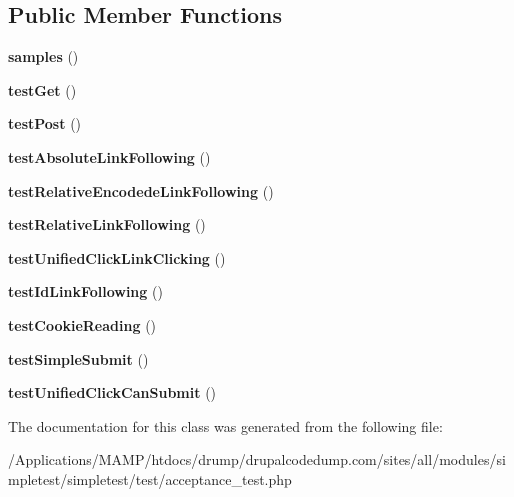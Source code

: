 \subsection*{Public Member Functions}
\begin{DoxyCompactItemize}
\item 
\hypertarget{class_test_of_live_browser_a60930689b5b51f4587618c2006ceb881}{
{\bfseries samples} ()}
\label{class_test_of_live_browser_a60930689b5b51f4587618c2006ceb881}

\item 
\hypertarget{class_test_of_live_browser_a64c9f3e86bc8e36ee02c8564f030dd6a}{
{\bfseries testGet} ()}
\label{class_test_of_live_browser_a64c9f3e86bc8e36ee02c8564f030dd6a}

\item 
\hypertarget{class_test_of_live_browser_a950159db364644160ed605a9cd57b612}{
{\bfseries testPost} ()}
\label{class_test_of_live_browser_a950159db364644160ed605a9cd57b612}

\item 
\hypertarget{class_test_of_live_browser_a673123e9d8c302a536be2061071640f1}{
{\bfseries testAbsoluteLinkFollowing} ()}
\label{class_test_of_live_browser_a673123e9d8c302a536be2061071640f1}

\item 
\hypertarget{class_test_of_live_browser_ae2f7509d59f1ed6725f878d09997dae6}{
{\bfseries testRelativeEncodedeLinkFollowing} ()}
\label{class_test_of_live_browser_ae2f7509d59f1ed6725f878d09997dae6}

\item 
\hypertarget{class_test_of_live_browser_a8c840649d3161e59ef6ccd7714d62e48}{
{\bfseries testRelativeLinkFollowing} ()}
\label{class_test_of_live_browser_a8c840649d3161e59ef6ccd7714d62e48}

\item 
\hypertarget{class_test_of_live_browser_a0991ac974e9f01caf477b20288e8e382}{
{\bfseries testUnifiedClickLinkClicking} ()}
\label{class_test_of_live_browser_a0991ac974e9f01caf477b20288e8e382}

\item 
\hypertarget{class_test_of_live_browser_a9a7aa490118fbf1b0014bb46e605707b}{
{\bfseries testIdLinkFollowing} ()}
\label{class_test_of_live_browser_a9a7aa490118fbf1b0014bb46e605707b}

\item 
\hypertarget{class_test_of_live_browser_ac69b4087fdc0370f670f23bfb4530caf}{
{\bfseries testCookieReading} ()}
\label{class_test_of_live_browser_ac69b4087fdc0370f670f23bfb4530caf}

\item 
\hypertarget{class_test_of_live_browser_a8226f29835e8fe8e928512174db144f0}{
{\bfseries testSimpleSubmit} ()}
\label{class_test_of_live_browser_a8226f29835e8fe8e928512174db144f0}

\item 
\hypertarget{class_test_of_live_browser_a9e017ee39c1ce43ed526aed01425b03e}{
{\bfseries testUnifiedClickCanSubmit} ()}
\label{class_test_of_live_browser_a9e017ee39c1ce43ed526aed01425b03e}

\end{DoxyCompactItemize}


The documentation for this class was generated from the following file:\begin{DoxyCompactItemize}
\item 
/Applications/MAMP/htdocs/drump/drupalcodedump.com/sites/all/modules/simpletest/simpletest/test/acceptance\_\-test.php\end{DoxyCompactItemize}
